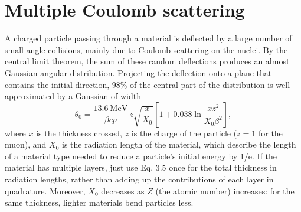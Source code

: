 \documentclass[11pt,a4paper,twoside,openright]{report}
\begin{document}
\section{Multiple Coulomb scattering}
A charged particle passing through a material is deflected by a large number of small-angle collisions, mainly due to Coulomb scattering on the nuclei. By the central limit theorem, the sum of these random deflections produces an almost Gaussian angular distribution\cite{PDG2026}. Projecting the deflection onto a plane that contains the initial direction, $98\%$ of the central part of the distribution is well approximated by a Gaussian of width
\begin{equation}
  \theta_0 = \frac{13.6~\mathrm{MeV}}{\beta c p}\, z
  \sqrt{\frac{x}{X_0}}
  \left[ 1 + 0.038 \ln\frac{x z^2}{X_0 \beta^2} \right],
  \label{eq:theta0}
\end{equation}
where $x$ is the thickness crossed, $z$ is the charge of the particle ($z=1$ for the muon), and $X_0$ is the radiation length of the material, which describe the length of a material type needed to reduce a particle's initial energy by 1/e. If the material has multiple layers, just use Eq. 3.5 once for the total thickness in radiation lengths, rather than adding up the contributions of each layer in quadrature. Moreover, $X_0$ decreases as $Z$ (the atomic number) increases: for the same thickness, lighter materials bend particles less.   
\end{document}
